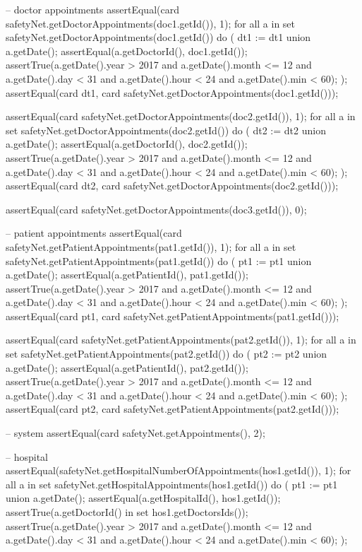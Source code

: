 \begin{vdmpp}[breaklines=true]
  -- doctor appointments
  assertEqual(card safetyNet.getDoctorAppointments(doc1.getId()), 1);
  for all a in set safetyNet.getDoctorAppointments(doc1.getId()) do (
   dt1 := dt1 union {a.getDate()};
   assertEqual(a.getDoctorId(), doc1.getId());
   assertTrue(a.getDate().year > 2017 and a.getDate().month <= 12 and a.getDate().day < 31 and a.getDate().hour < 24 and a.getDate().min < 60);
  );
  assertEqual(card dt1, card safetyNet.getDoctorAppointments(doc1.getId()));
  
  assertEqual(card safetyNet.getDoctorAppointments(doc2.getId()), 1);
  for all a in set safetyNet.getDoctorAppointments(doc2.getId()) do (
   dt2 := dt2 union {a.getDate()};
   assertEqual(a.getDoctorId(), doc2.getId());
   assertTrue(a.getDate().year > 2017 and a.getDate().month <= 12 and a.getDate().day < 31 and a.getDate().hour < 24 and a.getDate().min < 60);
  );
  assertEqual(card dt2, card safetyNet.getDoctorAppointments(doc2.getId()));
  
  
  assertEqual(card safetyNet.getDoctorAppointments(doc3.getId()), 0);
  
  
  -- patient appointments
  assertEqual(card safetyNet.getPatientAppointments(pat1.getId()), 1);
  for all a in set safetyNet.getPatientAppointments(pat1.getId()) do (
   pt1 := pt1 union {a.getDate()};
   assertEqual(a.getPatientId(), pat1.getId());
   assertTrue(a.getDate().year > 2017 and a.getDate().month <= 12 and a.getDate().day < 31 and a.getDate().hour < 24 and a.getDate().min < 60);
  );
  assertEqual(card pt1, card safetyNet.getPatientAppointments(pat1.getId()));
  
  
  assertEqual(card safetyNet.getPatientAppointments(pat2.getId()), 1);
  for all a in set safetyNet.getPatientAppointments(pat2.getId()) do (
   pt2 := pt2 union {a.getDate()};
   assertEqual(a.getPatientId(), pat2.getId());
   assertTrue(a.getDate().year > 2017 and a.getDate().month <= 12 and a.getDate().day < 31 and a.getDate().hour < 24 and a.getDate().min < 60);
  );
  assertEqual(card pt2, card safetyNet.getPatientAppointments(pat2.getId()));
  
  -- system
  assertEqual(card safetyNet.getAppointments(), 2);
  
  -- hospital
  assertEqual(safetyNet.getHospitalNumberOfAppointments(hos1.getId()), 1);
  for all a in set safetyNet.getHospitalAppointments(hos1.getId()) do (
   pt1 := pt1 union {a.getDate()};
   assertEqual(a.getHospitalId(), hos1.getId());
   assertTrue(a.getDoctorId() in set hos1.getDoctorsIds());
   assertTrue(a.getDate().year > 2017 and a.getDate().month <= 12 and a.getDate().day < 31 and a.getDate().hour < 24 and a.getDate().min < 60);
  );
   

\end{vdmpp}
